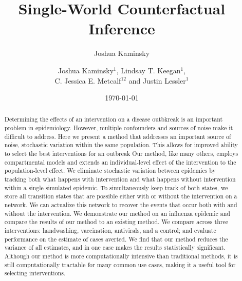 \documentclass[openacc]{rsproca_new}%
\author{Joshua Kaminsky}
\date{\today}
\title{}
\begin{document}
\title{Single-World Counterfactual Inference}

\author{%
Joshua Kaminsky$^{1}$, Lindsay T. Keegan$^{1}$,\\C. Jessica E. Metcalf$^{12}$ and Justin Lessler$^{1}$}

\address{$^{1}$Department of Epidemiology, Johns Hopkins Bloomberg School of Public Health, Baltimore, MD, USA\\
$^{2}$Department of Ecology and Evolutionary Biology, Princeton University, Princeton, NJ, USA}

\subject{Epidemiology, Infectious Disease Modeling}



\begin{abstract} %
  Determining the effects of an intervention on a disease outbkreak is an important problem in epidemiology.
  However, multiple confounders and sources of noise make it difficult to address. %
  Here we present a method that addresses an important source of noise, stochastic variation within the same population. %
  This allows for improved ability to select the best interventions for an outbreak
  Our method, like many others, employs compartmental models and extends an individual-level effect of the intervention to the population-level effect. %
  We eliminate stochastic variation between epidemics by tracking both what happens with intervention and what happens without intervention within a single simulated epidemic. %
  To simultaneously keep track of both states, we store all transition states that are possible either with or without the intervention on a network. %
  We can actualize this network to recover the events that occur both with and without the intervention. %
  We demonstrate our method on an influenza epidemic and compare the results of our method to an existing method.
  We compare across three interventions: handwashing, vaccination, antivirals, and a control; and evaluate performance on the estimate of cases averted.
  We find that our method reduces the variance of all estimates, and in one case makes the results statistically significant. %
  Although our method is more computationally intensive than traditional methods, it is still computationally tractable for many common use cases, making it a useful tool for selecting interventions. %
\end{abstract}
\end{document}
